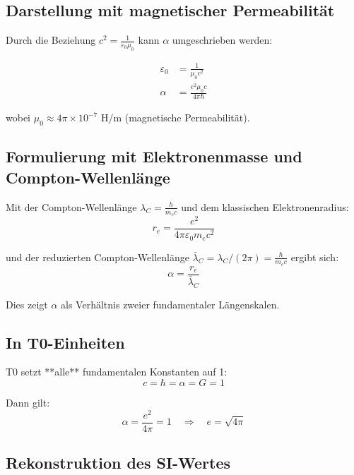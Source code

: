 	\subsection{Darstellung mit magnetischer Permeabilität}
	
	Durch die Beziehung $c^2 = \frac{1}{\varepsilon_0\mu_0}$ kann $\alpha$ umgeschrieben werden:
	
	\begin{align}
		\varepsilon_0 &= \frac{1}{\mu_0 c^2} \\
		\alpha &= \frac{e^2\mu_0 c}{4\pi\hbar}
	\end{align}
	
	wobei $\mu_0 \approx 4\pi \times 10^{-7}$ H/m (magnetische Permeabilität).
	
	\subsection{Formulierung mit Elektronenmasse und Compton-Wellenlänge}
	
	Mit der Compton-Wellenlänge $\lambda_C = \frac{h}{m_e c}$ und dem klassischen Elektronenradius:
	\begin{equation}
		r_e = \frac{e^2}{4\pi\varepsilon_0 m_e c^2}
	\end{equation}
	
	und der reduzierten Compton-Wellenlänge $\bar\lambda_C = \lambda_C/(2\pi) = \frac{\hbar}{m_e c}$ ergibt sich:
	\begin{equation}
		\alpha = \frac{r_e}{\bar\lambda_C}
	\end{equation}
	
	Dies zeigt $\alpha$ als Verhältnis zweier fundamentaler Längenskalen.
	
	\subsection{In T0-Einheiten}
	
	T0 setzt **alle** fundamentalen Konstanten auf 1:
	\begin{equation}
		c = \hbar = \alpha = G = 1
	\end{equation}
	
	Dann gilt:
	\begin{equation}
		\alpha = \frac{e^2}{4\pi} = 1 \quad \Rightarrow \quad e = \sqrt{4\pi}
	\end{equation}
	
	\subsection{Rekonstruktion des SI-Wertes}
	
